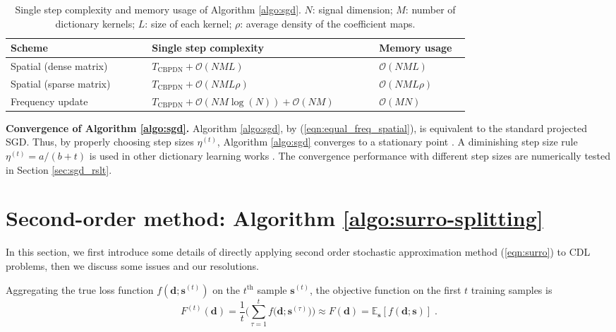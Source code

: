 \documentclass[final]{siamart1116}
\newcommand{\mb}[1]{\mathbf{#1}}
\def \co {\mathcal{O}}
\def \E  {\mathbb{E}}
\begin{document}
\begin{table}[t]
\centering
\begin{tabular}{|b{0.28\linewidth}|b{0.45\linewidth}|b{0.18\linewidth}|}
\hline
Scheme & Single step complexity & Memory usage\\
\hline \hline
Spatial (dense matrix) & $T_{\text{CBPDN}} + \co(NML)$ & $\co(NML)$\\
\hline
Spatial (sparse matrix) & $T_{\text{CBPDN}} + \co(NML\rho)$ & $\co(NML\rho)$\\
\hline
Frequency update & $T_{\text{CBPDN}} + \co(NM\log(N)) + \co(NM)$ & $\co(MN)$\\
\hline
\end{tabular}
\caption{Single step complexity and memory usage of Algorithm \ref{algo:sgd}. $N$: signal dimension; $M$: number of dictionary kernels; $L$: size of each kernel; $\rho$: average density of the coefficient maps.
}
\label{tab:summary}
\end{table}


\textbf{Convergence of Algorithm \ref{algo:sgd}.} Algorithm \ref{algo:sgd}, by (\ref{eqn:equal_freq_spatial}), is equivalent to the standard projected SGD. Thus, by properly choosing step sizes $\eta^{(t)}$, Algorithm \ref{algo:sgd} converges to a stationary point \cite{ghadimi2013stochastic}. A diminishing step size rule $\eta^{(t)} = a / (b+t)$ is used in other dictionary learning works \cite{aharon2008sparse,mairal2009online}. The convergence performance with different step sizes are numerically tested in Section \ref{sec:sgd_rslt}.






\section{Second-order method: Algorithm \ref{algo:surro-splitting}}
\label{sec:surrogate}

In this section, we first introduce some details of directly applying second order stochastic approximation method (\ref{eqn:surro}) to CDL problems, then we discuss some issues and our resolutions.


Aggregating the true loss function $f(\mb{d};\mb{s}^{(t)})$ on the $t^{\text{th}}$ sample $\mb{s}^{(t)}$, the objective function on the first $t$ training samples is
\begin{equation}
\label{eqn:F_standard}
F^{(t)}(\mb{d}) = \frac{1}{t}\Big(\sum_{\tau=1}^t f\big(\mb{d};\mb{s}^{(\tau)}\big)\Big) \approx F(\mb{d}) = \E_{\mb{s}}[ f(\mb{d}; \mb{s})] \;.
\end{equation}
\end{document}
